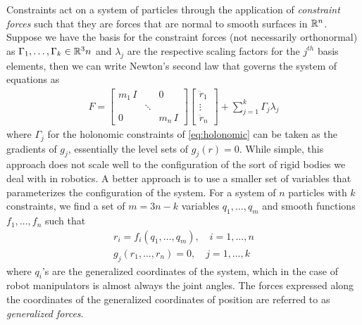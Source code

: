 Constraints act on a system of particles through the application of \textit{constraint forces} such that they are forces that are normal to smooth surfaces in $\mathbb{R}^n$. Suppose we have the basis for the constraint forces (not necessarily orthonormal) as $\Gamma_1, \ldots, \Gamma_k \in \mathbb{R}^3n$ and $\lambda_j$ are the respective scaling factors for the $j^{th}$ basis elements, then we can write Newton's second law that governs the system of equations as 
%
\begin{align}
	F = \begin{bmatrix}
	m_1 \, I &  & 0 \\
	& \ddots & \\
	0 & & m_n \, I
	\end{bmatrix}
	\begin{bmatrix}
	\ddot{r}_1  \\ \vdots \\ \ddot{r}_n
	\end{bmatrix} +  \sum_{j=1}^{k} \Gamma_j \lambda_j
\end{align}
%
where $\Gamma_j$ for the holonomic constraints of \eqref{eq:holonomic} can be taken as the gradients of $g_j$, essentially the level sets of $g_j(r) = 0$. 
%
While simple, this approach does not scale well to the configuration of the sort of rigid bodies we deal with in robotics. A better approach is to use a smaller set of variables that parameterizes the configuration of the system. For a system of $n$ particles with $k$ constraints, we find a set of $m = 3n -k$ variables $q_1, \ldots , q_m$ and smooth functions $f_1, \ldots, f_n$ such that 
%
\begin{align}
	r_i = f_i(q_1, \ldots, q_m), \quad i = 1, \ldots, n \\
	g_j(r_1, \ldots, r_n) = 0, \quad j = 1, \ldots, k
\end{align}
%
where $q_i$'s are the generalized coordinates of the system, which in the case of robot manipulators is almost always the joint angles.  The forces expressed along the coordinates of the generalized coordinates of position are referred to as \textit{generalized forces}. 

